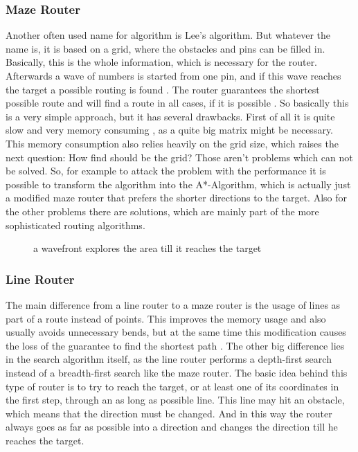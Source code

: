 \subsubsection{Maze Router}
Another often used name for algorithm is Lee's algorithm. But whatever the name is, it is based on a grid, where the obstacles and pins can be filled in. Basically, this is the whole information, which is necessary for the router. Afterwards a wave of numbers is started from one pin, and if this wave reaches the target a possible routing is found . The router guarantees the shortest possible route and will find a route in all cases, if it is possible \cite[p. 693]{kaufmann:electronic_design_automation}. So basically this is a very simple approach, but it has several drawbacks. First of all it is quite slow and very memory consuming \cite[p. 693]{kaufmann:electronic_design_automation}, as a quite big matrix might be necessary. This memory consumption also relies heavily on the grid size, which raises the next question: How find should be the grid? Those aren't problems which can not be solved. So, for example to attack the problem with the performance it is possible to transform the algorithm into the A*-Algorithm, which is actually just a modified maze router that prefers the shorter directions to the target. Also for the other problems there are solutions, which are mainly part of the more sophisticated routing algorithms.

\begin{figure}
	\centering
	
	\caption{a wavefront explores the area till it reaches the target}
	\label{fig:maze_router}
\end{figure}

\subsubsection{Line Router}
The main difference from a line router to a maze router is the usage of lines as part of a route instead of points. This improves the memory usage and also usually avoids unnecessary bends, but at the same time this modification causes the loss of the guarantee to find the shortest path \cite[p. 695]{kaufmann:electronic_design_automation}. The other big difference lies in the search algorithm itself, as the line router performs a depth-first search instead of a breadth-first search like the maze router. The basic idea behind this type of router is to try to reach the target, or at least one of its coordinates in the first step, through an as long as possible line. This line may hit an obstacle, which means that the direction must be changed. And in this way the router always goes as far as possible into a direction and changes the direction till he reaches the target.

